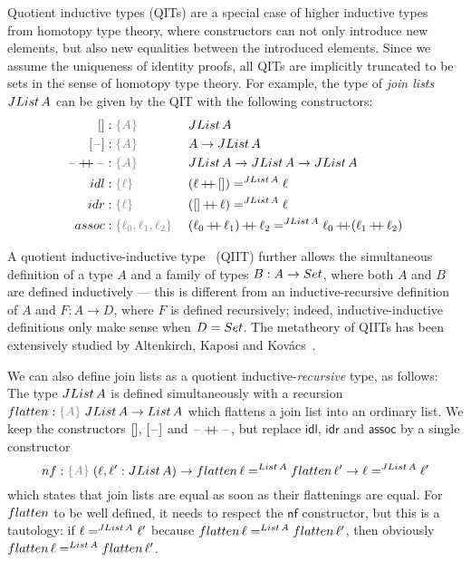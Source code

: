 \documentclass[a4paper,UKenglish,numberwithinsect,cleveref,thm-restate]{lipics-v2021}
\begin{document}
Quotient inductive types (QITs) are a special case of higher inductive types~\cite{Lumsdaine2020} from homotopy type theory, where constructors can not only introduce new elements, but also new equalities between the introduced elements.
%
Since we assume the uniqueness of identity proofs, all QITs are implicitly truncated to be sets in the sense of homotopy type theory.
%
For example, the type of \emph{join lists} $\JList{A}$ can be given by the QIT
with the following constructors:
\begin{alignat*}{3}
  \Jnil                    & : \implicit{A}      && \JList{A} \\
  \Jsing{\blank}           & : \implicit{A}      && A \to \JList{A} \\
  \Jconcat{\blank}{\blank} & : \implicit{A}      && \JList{A} \to \JList{A} \to \JList{A} \\
  \mathsf{idl}             & : \implicit{\ell}\; && (\Jconcat{\ell}{\Jnil}) =^{\JList{A}} \ell \\
  \mathsf{idr}             & : \implicit{\ell}\; && (\Jconcat{\Jnil}{\ell}) =^{\JList{A}} \ell \\
  \mathsf{assoc}           & : \implicit{\ell_0, \ell_1, \ell_2}\; && \Jconcat{(\Jconcat{\ell_0}{\ell_1})}{\ell_2} =^{\JList{A}} \Jconcat{\ell_0}{(\Jconcat{\ell_1}{\ell_2})}
\end{alignat*}


A quotient inductive-inductive type~\cite{Altenkirch2018} (QIIT) further allows the simultaneous definition of a type $A$ and a family of types $B : A \to \Set$, where both $A$ and $B$ are defined inductively --- this is different from an inductive-recursive definition of $A$ and $F : A \to D$, where $F$ is defined recursively; indeed, inductive-inductive definitions only make sense when $D = \Set$.
The metatheory of QIITs has been extensively studied by Altenkirch, Kaposi and Kov\'acs~\cite{Kaposi2018,Kaposi2019,Kovacs2020}.

We can also define join lists as a quotient inductive-\emph{recursive} type, as follows: The type $\JList{A}$ is defined simultaneously with a recursion $\flatten : \implicit{A}\;\JList{A} \to \List{A}$ which flattens a join list into an ordinary list. We keep the constructors $\Jnil$, $\Jsing{\blank}$ and $\mathord{\hspace{1pt}\text{--}\hspace{1pt}} \mathop{+\!\!+} \mathord{\hspace{1pt}\text{--}\hspace{1pt}}$, but replace $\mathsf{idl}$, $\mathsf{idr}$ and $\mathsf{assoc}$ by a single constructor
\[
  \mathsf{nf} : \implicit{A}\;(\ell, \ell' : \JList{A}) \to \flatten\,\ell =^{\mathsf{List}\,A} \flatten\,\ell' \to \ell =^{\JList{A}} \ell'
\]
which states that join lists are equal as soon as their flattenings are equal. For $\flatten$ to be well defined, it needs to respect the $\mathsf{nf}$ constructor, but this is a tautology: if $\ell =^{\JList{A}} \ell'$ because $\flatten\,\ell =^{\mathsf{List}\,A} \flatten\,\ell'$, then obviously $\flatten\,\ell =^{\mathsf{List}\,A} \flatten\,\ell'$.
\end{document}
